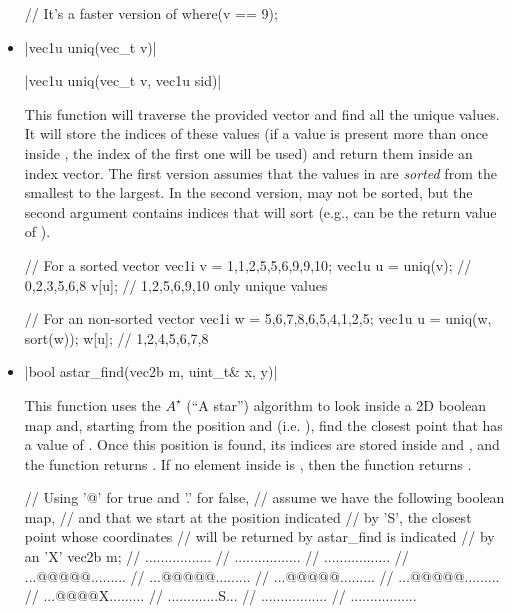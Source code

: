 \documentclass[12pt]{report}
\newenvironment{example}
{
    \begin{mdframed}[style=example,frametitle={Example}]
}
{
    \end{mdframed}
}
\begin{document}
\begin{itemize}
\begin{example}
\begin{cppcode}
// It's a faster version of
where(v == 9);
\end{cppcode}
\end{example}

\item \cppinline|vec1u uniq(vec_t v)| 

\cppinline|vec1u uniq(vec_t v, vec1u sid)|

This function will traverse the provided vector  and find all the unique values. It will store the indices of these values (if a value is present more than once inside , the index of the first one will be used) and return them inside an index vector. The first version assumes that the values in  are \emph{sorted} from the smallest to the largest. In the second version,  may not be sorted, but the second argument  contains indices that will sort  (e.g.,  can be the return value of ).

\begin{example}
\begin{cppcode}
// For a sorted vector
vec1i v = {1,1,2,5,5,6,9,9,10};
vec1u u = uniq(v); // {0,2,3,5,6,8}
v[u]; // {1,2,5,6,9,10} only unique values

// For an non-sorted vector
vec1i w = {5,6,7,8,6,5,4,1,2,5};
vec1u u = uniq(w, sort(w));
w[u]; // {1,2,4,5,6,7,8}
\end{cppcode}
\end{example}

\item \cppinline|bool astar_find(vec2b m, uint_t& x, y)| 

This function uses the $A^\star$ (``A star'') algorithm to look inside a 2D boolean map  and, starting from the position  and  (i.e. ), find the closest point that has a value of . Once this position is found, its indices are stored inside  and , and the function returns . If no element inside  is , then the function returns .

\begin{example}
\begin{cppcode}
// Using '@' for true and '.' for false,
// assume we have the following boolean map,
// and that we start at the position indicated
// by 'S', the closest point whose coordinates
// will be returned by astar_find is indicated
// by an 'X'
vec2b m;
// .................
// .................
// .................
// ...@@@@@.........
// ...@@@@@.........
// ...@@@@@.........
// ...@@@@@.........
// ...@@@@X.........
// .............S...
// .................
// .................


\end{cppcode}
\end{example}
\end{itemize}
\end{document}
